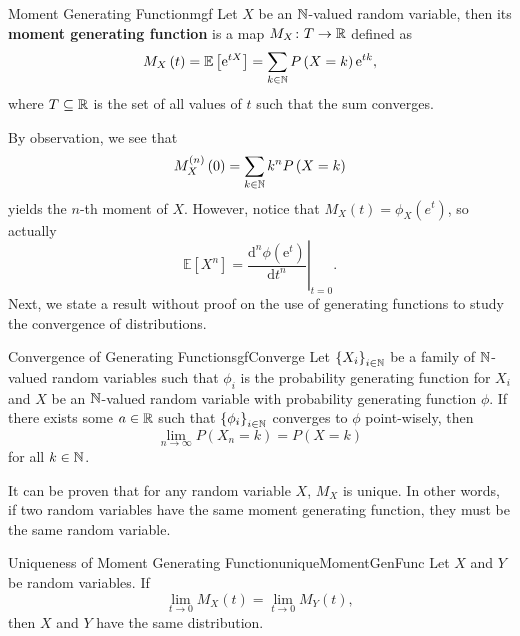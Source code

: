 \documentclass[math]{amznotes}
\theoremstyle{remark}
\newcommand{\0}{\mathbf{0}}
\newcommand{\1}{\mathbf{1}}
\newcommand{\e}{\mathrm{e}}
\renewcommand{\d}{\mathrm{d}}
\begin{document}
\begin{dfnbox}{Moment Generating Function}{mgf}
    Let $X$ be an $\mathbb{N}$-valued random variable, then its {\color{red} \textbf{moment generating function}} is a map $M_X \colon T \to \mathbb{R}$ defined as 
    \begin{equation*}
        M_X\left(t\right) = \mathbb{E}\left[\e^{tX}\right] = \sum_{k \in \N}P\left(X = k\right)\e^{tk},
    \end{equation*}
    where $T \subseteq \mathbb{R}$ is the set of all values of $t$ such that the sum converges.
\end{dfnbox}
By observation, we see that 
\begin{equation*}
    M_X^{(n)}\left(0\right) = \sum_{k \in \mathbb{N}}k^nP\left(X = k\right)
\end{equation*}
yields the $n$-th moment of $X$. However, notice that $M_X\left(t\right) = \phi_X\left(e^t\right)$, so actually 
\begin{equation*}
    \mathbb{E}\left[X^n\right] = \left.\frac{\d^n\phi\left(\e^t\right)}{\d t^n}\right\rvert_{t = 0}.
\end{equation*}
Next, we state a result without proof on the use of generating functions to study the convergence of distributions.
\begin{probox}{Convergence of Generating Functions}{gfConverge}
    Let $\left\{X_i\right\}_{i \in \mathbb{N}}$ be a family of $\mathbb{N}$-valued random variables such that $\phi_i$ is the probability generating function for $X_i$ and $X$ be an $\mathbb{N}$-valued random variable with probability generating function $\phi$. If there exists some $a \in \mathbb{R}$ such that $\left\{\phi_i\right\}_{i \in \mathbb{N}}$ converges to $\phi$ point-wisely, then 
    \begin{equation*}
        \lim_{n \to \infty}P\left(X_n = k\right) = P\left(X = k\right)
    \end{equation*}
    for all $k \in \mathbb{N}$.
\end{probox}
It can be proven that for any random variable $X$, $M_X$ is unique. In other words, if two random variables have the same moment generating function, they must be the same random variable.
\begin{thmbox}{Uniqueness of Moment Generating Function}{uniqueMomentGenFunc}
    Let $X$ and $Y$ be random variables. If
    \begin{equation*}
        \lim_{t \to 0}M_X(t) = \lim_{t \to 0}M_Y(t),
    \end{equation*}
    then $X$ and $Y$ have the same distribution.
\end{thmbox}
\end{document}
